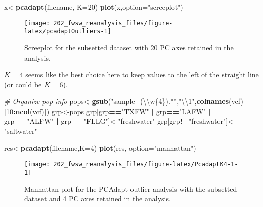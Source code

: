 \documentclass[11pt,]{article}
\newenvironment{Shaded}{\begin{snugshade}}{\end{snugshade}}
\newcommand{\KeywordTok}[1]{\textcolor[rgb]{0.13,0.29,0.53}{\textbf{#1}}}
\newcommand{\DataTypeTok}[1]{\textcolor[rgb]{0.13,0.29,0.53}{#1}}
\newcommand{\DecValTok}[1]{\textcolor[rgb]{0.00,0.00,0.81}{#1}}
\newcommand{\CharTok}[1]{\textcolor[rgb]{0.31,0.60,0.02}{#1}}
\newcommand{\StringTok}[1]{\textcolor[rgb]{0.31,0.60,0.02}{#1}}
\newcommand{\CommentTok}[1]{\textcolor[rgb]{0.56,0.35,0.01}{\textit{#1}}}
\newcommand{\OperatorTok}[1]{\textcolor[rgb]{0.81,0.36,0.00}{\textbf{#1}}}
\newcommand{\NormalTok}[1]{#1}
\begin{document}
\begin{Shaded}
\begin{Highlighting}[]
\NormalTok{x<-}\KeywordTok{pcadapt}\NormalTok{(filename, }\DataTypeTok{K=}\DecValTok{20}\NormalTok{)}
\KeywordTok{plot}\NormalTok{(x,}\DataTypeTok{option=}\StringTok{"screeplot"}\NormalTok{)}
\end{Highlighting}
\end{Shaded}

\begin{figure}[H]
\texttt{[image: 202\_fwsw\_reanalysis\_files/figure-latex/pcadaptOutliers-1]} \caption{Screeplot for the subsetted dataset with 20 PC axes retained in the analysis.}\label{fig:pcadaptOutliers}
\end{figure}

\(K=4\) seems like the best choice here to keep values to the left of
the straight line (or could be \(K=6\)).

\begin{Shaded}
\begin{Highlighting}[]
\CommentTok{# Organize pop info}
\NormalTok{pops<-}\KeywordTok{gsub}\NormalTok{(}\StringTok{"sample_(}\CharTok{\textbackslash{}\textbackslash{}}\StringTok{w\{4\}).*"}\NormalTok{,}\StringTok{"}\CharTok{\textbackslash{}\textbackslash{}}\StringTok{1"}\NormalTok{,}\KeywordTok{colnames}\NormalTok{(vcf)[}\DecValTok{10}\OperatorTok{:}\KeywordTok{ncol}\NormalTok{(vcf)])   }
\NormalTok{grp<-pops}
\NormalTok{grp[grp}\OperatorTok{==}\StringTok{"TXFW"} \OperatorTok{|}\StringTok{ }\NormalTok{grp}\OperatorTok{==}\StringTok{"LAFW"} \OperatorTok{|}\StringTok{ }\NormalTok{grp}\OperatorTok{==}\StringTok{"ALFW"} \OperatorTok{|}\StringTok{ }\NormalTok{grp}\OperatorTok{==}\StringTok{"FLLG"}\NormalTok{]<-}\StringTok{"freshwater"}
\NormalTok{grp[grp}\OperatorTok{!=}\StringTok{"freshwater"}\NormalTok{]<-}\StringTok{"saltwater"}
\end{Highlighting}
\end{Shaded}

\begin{Shaded}
\begin{Highlighting}[]
\NormalTok{res<-}\KeywordTok{pcadapt}\NormalTok{(filename,}\DataTypeTok{K=}\DecValTok{4}\NormalTok{)}
\KeywordTok{plot}\NormalTok{(res, }\DataTypeTok{option=}\StringTok{"manhattan"}\NormalTok{)}
\end{Highlighting}
\end{Shaded}

\begin{figure}[H]
\texttt{[image: 202\_fwsw\_reanalysis\_files/figure-latex/PcadaptK4-1-1]} \caption{Manhattan plot for the PCAdapt outlier analysis with the subsetted dataset and 4 PC axes retained in the analysis.}\label{fig:PcadaptK4-1}
\end{figure}
\end{document}
